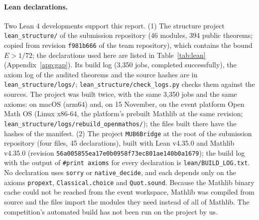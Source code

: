 \documentclass[11pt]{article}
\newcommand{\E}{E}                       %
\theoremstyle{definition}
\theoremstyle{remark}
\begin{document}
\paragraph{Lean declarations.} Two Lean 4 developments support this report.
(1) The structure project \texttt{lean\_structure/} of the submission repository (46 modules, 394 public theorems; copied from revision \texttt{f981b666} of the team repository),
which contains the bound $\E>1/72$; the declarations used here are listed in Table~\ref{tab:lean}
(Appendix~\ref{app:gap}). Its build log (3{,}350 jobs, completed successfully), the axiom log of the audited theorems and the source hashes are in \texttt{lean\_structure/logs/}; \texttt{lean\_structure/check\_logs.py} checks them against the sources. The project was built twice, with the same 3{,}350 jobs and the same axioms: on macOS (arm64) and, on 15 November, on the event platform Open Math OS (Linux x86-64, the platform's prebuilt Mathlib at the same revision; \texttt{lean\_structure/logs/rebuild\_openmathos/}); the files built there have the hashes of the manifest.
(2) The project \texttt{MUB6Bridge} at the root of the submission repository (four files, 45 declarations), built
with Lean v4.35.0 and Mathlib v4.35.0 (revision \texttt{56a005855ea17e0b0958f73ec801ae140b0a1679}); the build
log with the output of \texttt{\#print axioms} for every declaration is \texttt{lean/BUILD\_LOG.txt}. No
declaration uses \texttt{sorry} or \texttt{native\_decide}, and each depends only on the axioms \texttt{propext},
\texttt{Classical.choice} and \texttt{Quot.sound}. Because the Mathlib binary cache could not be reached from the
event workspace, Mathlib was compiled from source and the files import the modules they need instead of all of
Mathlib. The competition's automated build has not been run on the project by us.
\end{document}
